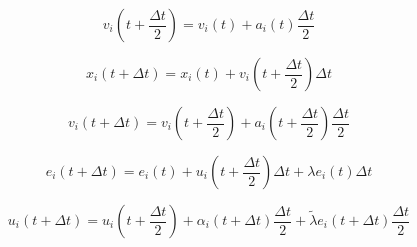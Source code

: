 \documentclass{article}
\begin{document}
	\begin{equation*}
		v_i(t+\frac{\Delta t}{2}) = v_i(t) + a_i(t)\frac{\Delta t}{2}
	\end{equation*}

	\begin{equation*}
		x_i(t+\Delta t) = x_i(t) + v_i(t+\frac{\Delta t}{2})\Delta t
	\end{equation*}
	
	\begin{equation*}
		v_i(t+\Delta t) = v_i(t+\frac{\Delta t}{2}) + a_i(t+\frac{\Delta t}{2})\frac{\Delta t}{2}
	\end{equation*}

	\begin{equation*}
		e_i(t+\Delta t) = e_i(t) + u_i(t + \frac{\Delta t}{2})\Delta t + \lambda e_i(t) \Delta t
	\end{equation*}

	\begin{equation*}
		u_i(t+\Delta t) = u_i(t+\frac{\Delta t}{2}) + \alpha_i(t+\Delta t)\frac{\Delta t}{2} + \tilde{\lambda} e_i(t+\Delta t)\frac{\Delta t}{2}
	\end{equation*}
\end{document}

